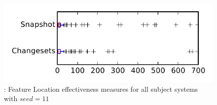 
\begin{figure}
\centering
\includegraphics[height=0.4\textheight]{figures/flt_seed/rq1_tiny_11}
\caption{\rone: Feature Location effectiveness measures for all subject systems with $seed=11$}
\label{fig:flt_seed:rq1:tiny}
\end{figure}
